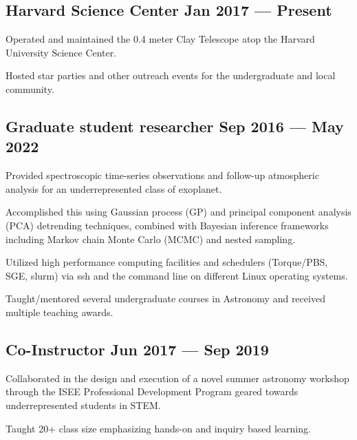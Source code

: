 \subsection[A]{Harvard Science Center \hfill Jan 2017 --- Present}
\begin{zitemize}
\item Operated and maintained the 0.4 meter Clay Telescope atop the Harvard University Science Center.
\item Hosted star parties and other outreach events for the undergraduate and local community.
\end{zitemize}

\subsection[B]{Graduate student researcher \hfill Sep 2016 --- May 2022}
\begin{zitemize}
\item Provided spectroscopic time-series observations and follow-up atmospheric analysis for an underrepresented class of exoplanet.
\item Accomplished this using Gaussian process (GP) and principal component analysis (PCA) detrending techniques, combined with Bayesian inference frameworks including Markov chain Monte Carlo (MCMC) and nested sampling.
\item Utilized high performance computing facilities and schedulers (Torque/PBS, SGE, slurm) via ssh and the command line on different Linux operating systems.
\item Taught/mentored several undergraduate courses in Astronomy and received multiple teaching awards.
\end{zitemize}

\subsection[C]{Co-Instructor \hfill Jun 2017 --- Sep 2019}
\begin{zitemize}
\item Collaborated in the design and execution of a novel summer astronomy workshop through the ISEE Professional Development Program geared towards underrepresented students in STEM.
\item Taught 20+ class size emphasizing hands-on and inquiry based learning.
\end{zitemize}